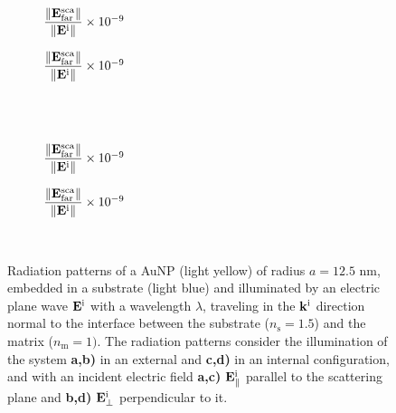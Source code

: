 \begin{figure}[b!]
    \centering
    \def\svgwidth{.8\textwidth}
    \hspace*{-.215\textwidth}%
    \vspace*{-.5em}%
        \begin{subfigure}{.32\textwidth}\caption{\footnotesize$\dfrac{\norm{\vb{E}^\text{sca}_\text{far}}}{\norm{\vb{E}^\text{i}}} \times 10^{-9}$  }\label{sfig:Far:Emb:Norm:a}\end{subfigure}%
        \begin{subfigure}{.4\textwidth}\caption{\footnotesize$\dfrac{\norm{\vb{E}^\text{sca}_\text{far}}}{\norm{\vb{E}^\text{i}}} \times 10^{-9}$  }\label{sfig:Far:Emb:Norm:b}\end{subfigure}\\
    \\
    \def\svgwidth{.8\textwidth}
    \hspace*{-.215\textwidth}%
    \vspace*{-.5em}%
        \begin{subfigure}{.32\textwidth}\caption{\footnotesize$\dfrac{\norm{\vb{E}^\text{sca}_\text{far}}}{\norm{\vb{E}^\text{i}}} \times 10^{-9}$  }\label{sfig:Far:Emb:Norm:c}\end{subfigure}%
        \begin{subfigure}{.4\textwidth}\caption{\footnotesize$\dfrac{\norm{\vb{E}^\text{sca}_\text{far}}}{\norm{\vb{E}^\text{i}}} \times 10^{-9}$  }\label{sfig:Far:Emb:Norm:d}\end{subfigure}\\
    \caption[ Radiation pattern of a AuNP totally embedded in a substrate illuminated at normal incidence ]{Radiation patterns of a AuNP (light yellow) of radius $a = 12.5$ nm, embedded in a substrate (light blue) and illuminated by an electric plane wave $\vb{E}^\text{i}$ with a wavelength $\lambda$, traveling in the $\vb{k}^\text{i}$ direction normal to the interface between the substrate ($n_\text{s} = 1.5$) and the matrix ($n_\text{m} = 1)$. The radiation patterns consider the illumination of the system  \textbf{a,b)} in an external and  \textbf{c,d)} in an internal configuration, and with an incident electric field \textbf{a,c)}  $\vb{E}^\text{i}_\parallel$ parallel to the scattering plane and \textbf{b,d)} $\vb{E}^\text{i}_\perp$ perpendicular to it.}
    \label{fig:Far:Emb:Norm}
\end{figure}

